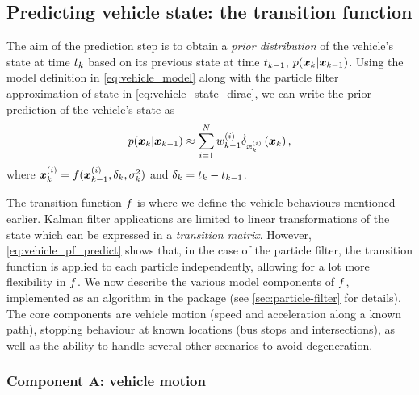 \subsection{Predicting vehicle state: the transition function}
\label{sec:vehicle_model_trans}

The aim of the prediction step is to obtain a \emph{prior distribution} of the vehicle's state at time $t_k$ based on its previous state at time $t_{k-1}$, $p(\boldsymbol x_k | \boldsymbol x_{k-1})$. Using the model definition in \cref{eq:vehicle_model} along with the particle filter approximation of state in \cref{eq:vehicle_state_dirac}, we can write the prior prediction of the vehicle's state as
\begin{equation}
\label{eq:vehicle_pf_predict}
p(\boldsymbol x_k | \boldsymbol x_{k-1}) \approx
\sum_{i=1}^N
    w^{(i)}_{k-1}
    \dot\delta_{\boldsymbol x_k^{(i)}}\left(\boldsymbol x_k\right),
\end{equation}
where $\boldsymbol x_k^{(i)} = f(\boldsymbol x^{(i)}_{k-1}, \delta_k, \sigma^2_k)$ and $\delta_k = t_k - t_{k-1}$.

The transition function $f$ is where we define the vehicle behaviours mentioned earlier. Kalman filter applications are limited to linear transformations of the state which can be expressed in a \emph{transition matrix}. However, \cref{eq:vehicle_pf_predict} shows that, in the case of the particle filter, the transition function is applied to each particle independently, allowing for a lot more flexibility in $f$. We now describe the various model components of $f$, implemented as an algorithm in the  package (see \cref{sec:particle-filter} for details). The core components are vehicle motion (speed and acceleration along a known path), stopping behaviour at known locations (bus stops and intersections), as well as the ability to handle several other scenarios to avoid degeneration.


\subsubsection{Component A: vehicle motion}
\label{sec:vehicle_model_behaviour}

